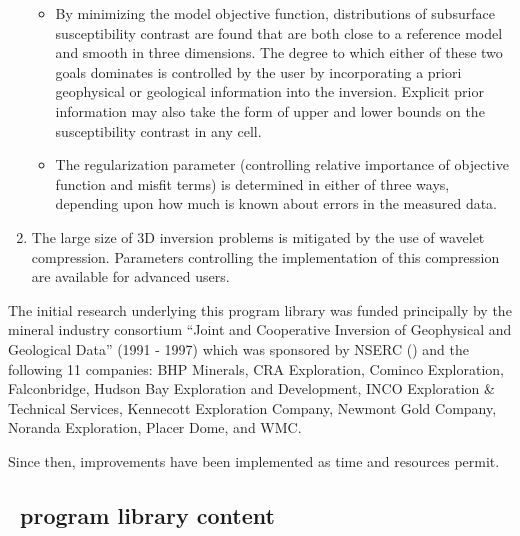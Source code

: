 \begin{enumerate}
\begin{itemize}
\item By minimizing the model objective function, distributions of subsurface susceptibility contrast are found that are both close to a reference model and smooth in three dimensions. The degree to which either of these two goals dominates is controlled by the user by incorporating a priori geophysical or geological information into the inversion. Explicit prior information may also take the form of upper and lower bounds on the susceptibility contrast in any cell.
\item The regularization parameter (controlling relative importance of objective function and misfit terms) is determined in either of three ways, depending upon how much is known about errors in the measured data.
\end{itemize}

\item The large size of 3D inversion problems is mitigated by the use of wavelet compression. Parameters controlling the implementation of this compression are available for advanced users.
\end{enumerate}

The initial research underlying this program library was funded principally by the mineral industry consortium ``Joint and Cooperative Inversion of Geophysical and Geological Data'' (1991 - 1997) which was sponsored by NSERC (\NSERC) and the following 11 companies: BHP Minerals, CRA Exploration, Cominco Exploration, Falconbridge, Hudson Bay Exploration and Development, INCO Exploration \& Technical Services, Kennecott Exploration Company, Newmont Gold Company, Noranda Exploration, Placer Dome, and WMC.

Since then, improvements have been implemented as time and resources permit.

\subsection{\programName ~program library content}

